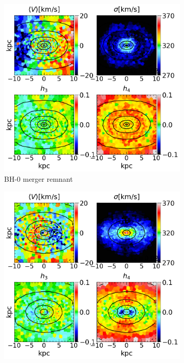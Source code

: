 \documentclass[english, twoside]{HYgradu}
\begin{document}
\begin{figure}
	\centering
	\begin{subfigure}[b]{0.49\textwidth}
		\includegraphics[width=\textwidth]{BH_0.png}
		\caption{BH-0 merger remnant}
	\end{subfigure}
	\begin{subfigure}[b]{0.49\textwidth}
		\includegraphics[width=\textwidth]{BH_6.png}

\end{subfigure}
\end{figure}
\end{document}

